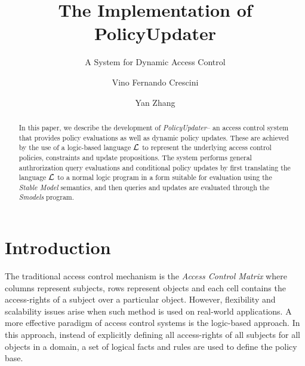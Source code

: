\documentclass{llncs}
\begin{document}
  \long{}

  \title{The Implementation of PolicyUpdater}
  \subtitle{A System for Dynamic Access Control}

  \author{Vino Fernando Crescini \and Yan Zhang}


  \maketitle

  \begin{abstract}
    In this paper, we describe the development of \emph{PolicyUpdater}\footnotemark -- an
    access control system that provides policy evaluations as well as dynamic
    policy updates. These are achieved by the use of a logic-based language
    $\cal{L}$ to represent the underlying access control policies, constraints
    and update propositions. The system performs general authrorization query
    evaluations and conditional policy updates by first translating the language
    $\cal{L}$ to a normal logic program in a form suitable for evaluation using
    the \emph{Stable Model} semantics, and then queries and updates are
    evaluated through the \emph{Smodels} program.
  \end{abstract}


  \section{Introduction}

    The traditional access control mechanism is the \emph{Access Control Matrix}
    where columns represent subjects, rows represent objects and each cell
    contains the access-rights of a subject over a particular object. However,
    flexibility and scalability issues arise when such method is used on
    real-world applications. A more effective paradigm of access control
    systems is the logic-based approach. In this approach, instead of
    explicitly defining all access-rights of all subjects for all objects
    in a domain, a set of logical facts and rules are used to define the
    policy base. 
\end{document}
